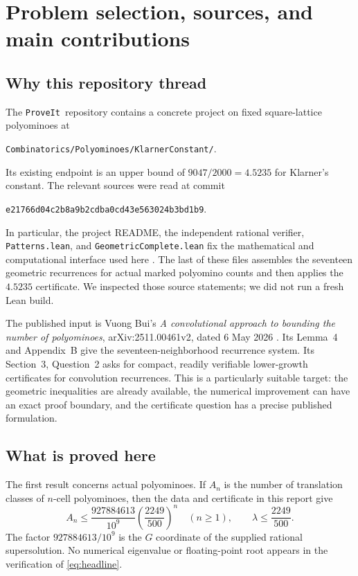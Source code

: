 \documentclass[11pt,a4paper]{article}
\theoremstyle{definition}
\theoremstyle{remark}
\newcommand{\repo}{\texttt{ProveIt}}
\newcommand{\sha}{\texttt{e21766d04c2b8a9b2cdba0cd43e563024b3bd1b9}}
\begin{document}
\hypersetup{pageanchor=true}
{\small\setlength{\parskip}{0pt}\tableofcontents}
\clearpage
{}

\section{Problem selection, sources, and main contributions}
\label{sec:scope}

\subsection{Why this repository thread}
The \repo\ repository contains a concrete project on fixed square-lattice
polyominoes at
\begin{center}\small
\texttt{Combinatorics/Polyominoes/KlarnerConstant/}.
\end{center}
Its existing endpoint is an upper bound of $9047/2000=4.5235$ for Klarner's
constant. The relevant sources were read at commit
\begin{center}\small\sha.\end{center}
In particular, the project README, the independent rational verifier,
\texttt{Patterns.lean}, and \texttt{GeometricComplete.lean} fix the mathematical
and computational interface used here \cite{repo,reporeadme,repocert,repopatterns,repocomplete}.
The last of these files assembles the seventeen geometric recurrences for
actual marked polyomino counts and then applies the $4.5235$ certificate.
We inspected those source statements; we did not run a fresh Lean build.

The published input is Vuong Bui's \emph{A convolutional approach to bounding
the number of polyominoes}, arXiv:2511.00461v2, dated 6 May 2026
\cite{bui}. Its Lemma~4 and Appendix~B give the seventeen-neighborhood
recurrence system. Its Section~3, Question~2 asks for compact, readily
verifiable lower-growth certificates for convolution recurrences.
This is a particularly suitable target: the geometric inequalities are
already available, the numerical improvement can have an exact proof
boundary, and the certificate question has a precise published formulation.

\subsection{What is proved here}
The first result concerns actual polyominoes. If $A_n$ is the number of
translation classes of $n$-cell polyominoes, then the data and certificate in
this report give
\begin{equation}\label{eq:headline}
 A_n\leq\frac{927884613}{10^9}\left(\frac{2249}{500}\right)^n
 \quad(n\geq1),\qquad
 \lambda\leq\frac{2249}{500}.
\end{equation}
The factor $927884613/10^9$ is the $G$ coordinate of the supplied rational
supersolution. No numerical eigenvalue or floating-point root appears in the
verification of \eqref{eq:headline}.
\end{document}
